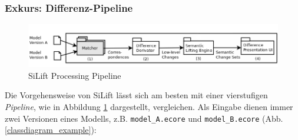 \subsubsection*{Exkurs: Differenz-Pipeline}

\begin{figure}[h!]
\centering
\includegraphics[width=\textwidth]{architecture/graphics/silift-pipeline.png}
\caption{SiLift Processing Pipeline}
\label{silift-pipeline}
\end{figure}

Die Vorgehensweise von SiLift lässt sich am besten mit einer vierstufigen \textit{Pipeline}, wie in Abbildung \ref{silift-pipeline} dargestellt,  vergleichen.
Als Eingabe dienen immer zwei Versionen eines Modells, z.B. \texttt{model\_A.ecore} und \texttt{model\_B.ecore} (Abb. \ref{classdiagram_example}):

